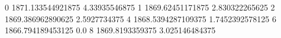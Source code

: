 0 1871.133544921875 4.33935546875
1 1869.62451171875 2.830322265625
2 1869.386962890625 2.5927734375
4 1868.5394287109375 1.7452392578125
6 1866.794189453125 0.0
8 1869.8193359375 3.025146484375
